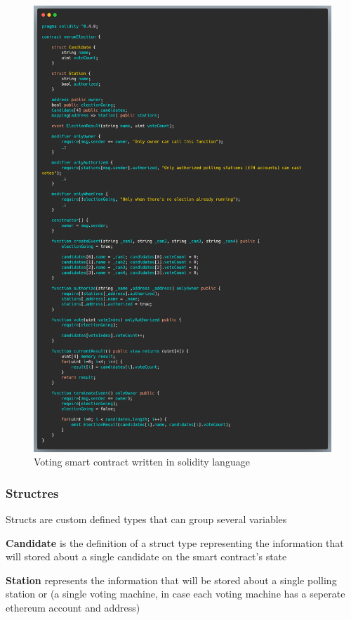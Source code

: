 \begin{figure}[H]
	\centering
		\includegraphics[width=12cm]{images/chapter3/smart-contract.png}
		\caption{{\footnotesize Voting smart contract written in solidity language}}
\end{figure}

\subsubsection{Structres}

Structs are custom defined types that can group several variables

\begin{list}{}{}
\item \textbf{Candidate} is the definition of a struct type representing the information that will stored about a single candidate on the smart contract's state
\item \textbf{Station} represents the information that will be stored about a single polling station or (a single voting machine, in case each voting machine has a seperate ethereum account and address)
\end{list}

